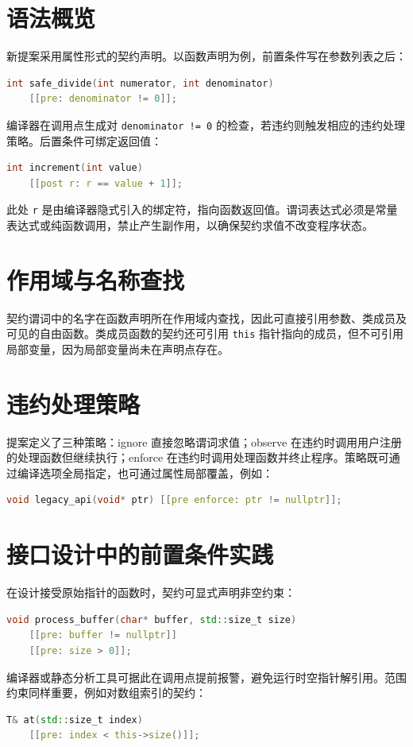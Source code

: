 \chapter{语法概览}
新提案采用属性形式的契约声明。以函数声明为例，前置条件写在参数列表之后：\par
\begin{lstlisting}[language=cpp]
int safe_divide(int numerator, int denominator)
    [[pre: denominator != 0]];
\end{lstlisting}
编译器在调用点生成对 \texttt{denominator != 0} 的检查，若违约则触发相应的违约处理策略。后置条件可绑定返回值：\par
\begin{lstlisting}[language=cpp]
int increment(int value)
    [[post r: r == value + 1]];
\end{lstlisting}
此处 \texttt{r} 是由编译器隐式引入的绑定符，指向函数返回值。谓词表达式必须是常量表达式或纯函数调用，禁止产生副作用，以确保契约求值不改变程序状态。\par
\chapter{作用域与名称查找}
契约谓词中的名字在函数声明所在作用域内查找，因此可直接引用参数、类成员及可见的自由函数。类成员函数的契约还可引用 \texttt{this} 指针指向的成员，但不可引用局部变量，因为局部变量尚未在声明点存在。\par
\chapter{违约处理策略}
提案定义了三种策略：ignore 直接忽略谓词求值；observe 在违约时调用用户注册的处理函数但继续执行；enforce 在违约时调用处理函数并终止程序。策略既可通过编译选项全局指定，也可通过属性局部覆盖，例如：\par
\begin{lstlisting}[language=cpp]
void legacy_api(void* ptr) [[pre enforce: ptr != nullptr]];
\end{lstlisting}
\chapter{接口设计中的前置条件实践}
在设计接受原始指针的函数时，契约可显式声明非空约束：\par
\begin{lstlisting}[language=cpp]
void process_buffer(char* buffer, std::size_t size)
    [[pre: buffer != nullptr]]
    [[pre: size > 0]];
\end{lstlisting}
编译器或静态分析工具可据此在调用点提前报警，避免运行时空指针解引用。范围约束同样重要，例如对数组索引的契约：\par
\begin{lstlisting}[language=cpp]
T& at(std::size_t index)
    [[pre: index < this->size()]];
\end{lstlisting}
